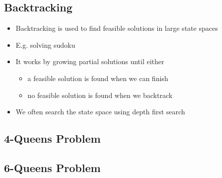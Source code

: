\begin{slide}
\section{Backtracking}

\begin{PauseHighLight}
  \begin{itemize}
  \item Backtracking is used to find feasible solutions in large state
    spaces\pause
  \item E.g. solving sudoku\pause
  \item It works by growing partial solutions until either
    \begin{itemize}
    \item a feasible solution is found when we can finish
    \item no feasible solution is found when we backtrack\pause
    \end{itemize}
  \item We often search the state space using depth first search\pause
  \end{itemize}
\end{PauseHighLight}

\end{slide}


\begin{slide}
\section[-2]{4-Queens Problem}
\pb
\pause{}
\begin{center}
  \pause
\end{center}
\end{slide}


\begin{slide}
\section[-2]{6-Queens Problem}
\pb
\pause
\begin{center}
  \pause
\end{center}
\end{slide}


